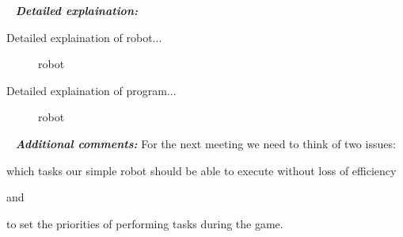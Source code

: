 	 \newline
	\textit{\textbf{Detailed explaination:}}
	\begin{enumerate*}
		\item Detailed explaination of robot...
		\begin{figure}[H]
			\begin{minipage}[h]{1\linewidth}
				\caption{robot}
			\end{minipage}
		\end{figure}
		
		\item Detailed explaination of program...
		\begin{figure}[H]
			\begin{minipage}[h]{1\linewidth}
				\caption{robot}
			\end{minipage}
		\end{figure}
		
	\end{enumerate*}
	
	 \newline
	\textit{\textbf{Additional comments:}} For the next meeting we need to think of two issues:
	\begin{enumerate*}
		\item which tasks our simple robot should be able to execute without loss of efficiency
		
		and
		
		\item to set the priorities of performing tasks during the game.
		
	\end{enumerate*}
  


\fillpage
